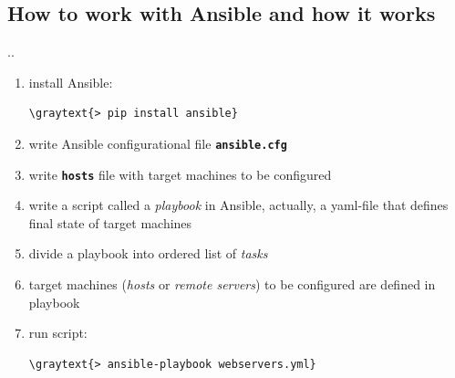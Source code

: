 \documentclass[pdf, 8pt, unicode, t]{beamer} %
\newcommand{\graytext}[1]{{\usebeamercolor[fg]{graytext_color}#1}}
\newcommand{\myinsertsubsection}{\alert{\Large\insertsectionnumber.\insertsubsectionnumber. \insertsubsection}\\}
\begin{document}
\subsection{How to work with Ansible and how it works}
\begin{frame}[fragile, label=none]
%
\myinsertsubsection
\vspace{1em}

\begin{enumerate}
\setlength\itemsep{1.5em}
\item install Ansible:
\begin{Verbatim}[commandchars=\\\{\}]
\graytext{> pip install ansible}
\end{Verbatim}
\item write Ansible configurational file \texttt{\bf{ansible.cfg}}
\item write \texttt{\bf{hosts}} file with target machines to be configured
\item write a script called a {\it playbook} in Ansible, actually, a yaml-file
that defines final state of target machines
\item divide a playbook into ordered list of {\it tasks}
\item target machines ({\it hosts} or {\it remote servers}) to be configured are defined in playbook
\item run script:
\begin{Verbatim}[commandchars=\\\{\}]
\graytext{> ansible-playbook webservers.yml}
\end{Verbatim}
\end{enumerate}
\end{frame}
\end{document}
